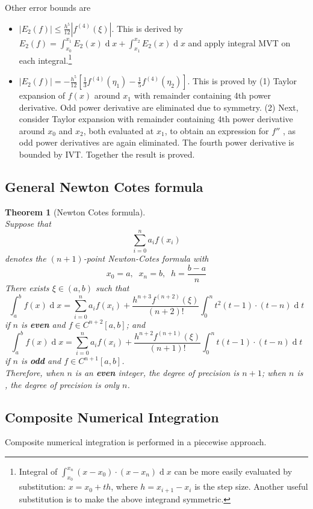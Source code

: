 \documentclass[12pt]{article}
\newtheorem{theorem}{Theorem}[section]
\theoremstyle{definition}
\DeclareMathOperator{\diff}{d}
\begin{document}
Other error bounds are
\begin{itemize}
  \item $|E_2(f)|\leq \frac{h^5}{12}|f^{(4)}(\xi)|$. This is derived by $E_2(f)=\int_{x_0}^{x_1} E_2(x)\diff x+\int_{x_1}^{x_2}E_2(x)\diff x$ and apply integral MVT on each integral.\footnote{Integral of $\int_{x_0}^{x_n}(x-x_0)\cdot(x-x_n)\diff x$ can be more easily evaluated by substitution: $x=x_0+th$, where $h=x_{i+1}-x_i$ is the step size. Another useful substitution is to make the above integrand symmetric.}
  \item $|E_2(f)|=-\frac{h^5}{12}[\frac{1}{3}f^{(4)}(\eta_1)-\frac{1}{5}f^{(4)}(\eta_2)]$. This is proved by (1) Taylor expansion of $f(x)$ around $x_1$ with remainder containing 4th power derivative. Odd power derivative are eliminated due to symmetry. (2) Next, consider Taylor expansion with remainder containing 4th power derivative around $x_0$ and $x_2$, both evaluated at $x_1$, to obtain an expression for $f''$ , as odd power derivatives are again eliminated. The fourth power derivative is bounded by IVT. Together the result is proved. 
\end{itemize}
\subsection{General Newton Cotes formula}
\begin{theorem}[Newton Cotes formula]
\hfill\\\normalfont Suppose that
\[
\sum_{i=0}^n a_if(x_i)
\]
denotes the $(n+1)$-point Newton-Cotes formula with
\[
x_0=a,\;\;x_n=b,\;\;h=\frac{b-a}{n} 
\]
There exists $\xi\in(a,b)$ such that
\[
\int_a^bf(x)\diff x = \sum_{i=0}^n a_if(x_i)+\frac{h^{n+3}f^{(n+2)}(\xi)}{(n+2)!}\int_0^nt^2(t-1)\cdot(t-n)\diff t
\]
if $n$ is \textbf{even} and $f\in C^{n+2}[a,b]$; and
\[
\int_a^bf(x)\diff x = \sum_{i=0}^n a_if(x_i)+\frac{h^{n+2}f^{(n+1)}(\xi)}{(n+1)!}\int_0^nt(t-1)\cdot(t-n)\diff t
\]
if $n$ is \textbf{odd} and $f\in C^{n+1}[a,b]$.\\
Therefore, when $n$ is an \textbf{even} integer, the degree of precision is $n+1$; when $n$ is , the degree of precision is only $n$.
\end{theorem}
\subsection{Composite Numerical Integration}
Composite numerical integration is performed in a piecewise approach.
\end{document}
